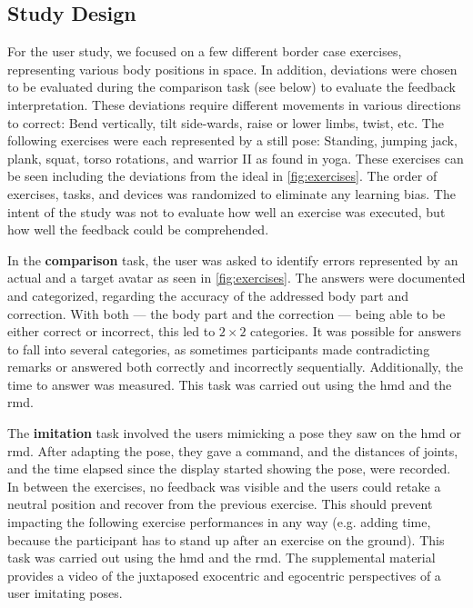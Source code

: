 \subsection{Study Design \label{sec:design}}
For the user study, we focused on a few different border case exercises, representing various body positions in space. In addition, deviations were chosen to be evaluated during the comparison task (see below) to evaluate the feedback interpretation. These deviations require different movements in various directions to correct: Bend vertically, tilt side-wards, raise or lower limbs, twist, etc. The following exercises were each represented by a still pose: Standing, jumping jack, plank, squat, torso rotations, and warrior II as found in yoga. These exercises can be seen including the deviations from the ideal in \autoref{fig:exercises}. The order of exercises, tasks, and devices was randomized to eliminate any learning bias. The intent of the study was not to evaluate how well an exercise was executed, but how well the feedback could be comprehended.

In the \textbf{comparison} task, the user was asked to identify errors represented by an actual and a target avatar as seen in \autoref{fig:exercises}. The answers were documented and categorized, regarding the accuracy of the addressed body part and correction. With both --- the body part and the correction --- being able to be either correct or incorrect, this led to $2 \times 2$ categories. It was possible for answers to fall into several categories, as sometimes participants made contradicting remarks or answered both correctly and incorrectly sequentially. Additionally, the time to answer was measured. This task was carried out using the \acrshort{hmd} and the \acrshort{rmd}.

The \textbf{imitation} task involved the users mimicking a pose they saw on the \acrshort{hmd} or \acrshort{rmd}. After adapting the pose, they gave a command, and the distances of joints, and the time elapsed since the display started showing the pose, were recorded. In between the exercises, no feedback was visible and the users could retake a neutral position and recover from the previous exercise. This should prevent impacting the following exercise performances in any way (e.g. adding time, because the participant has to stand up after an exercise on the ground). This task was carried out using the \acrshort{hmd} and the \acrshort{rmd}. The supplemental material provides a video of the juxtaposed exocentric and egocentric perspectives of a user imitating poses.

